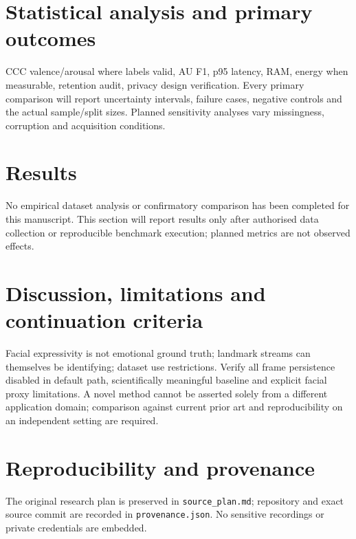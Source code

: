 \documentclass[11pt,a4paper]{article}
\begin{document}
\section{Statistical analysis and primary outcomes}
CCC valence/arousal where labels valid, AU F1, p95 latency, RAM, energy when measurable, retention audit, privacy design verification. Every primary comparison will report uncertainty intervals, failure cases, negative controls and the actual sample/split sizes. Planned sensitivity analyses vary missingness, corruption and acquisition conditions.
\section{Results}
No empirical dataset analysis or confirmatory comparison has been completed for this manuscript. This section will report results only after authorised data collection or reproducible benchmark execution; planned metrics are not observed effects.
\section{Discussion, limitations and continuation criteria}
Facial expressivity is not emotional ground truth; landmark streams can themselves be identifying; dataset use restrictions. Verify all frame persistence disabled in default path, scientifically meaningful baseline and explicit facial proxy limitations. A novel method cannot be asserted solely from a different application domain; comparison against current prior art and reproducibility on an independent setting are required.
\section{Reproducibility and provenance}
The original research plan is preserved in \texttt{source\_plan.md}; repository and exact source commit are recorded in \texttt{provenance.json}. No sensitive recordings or private credentials are embedded.
\end{document}
